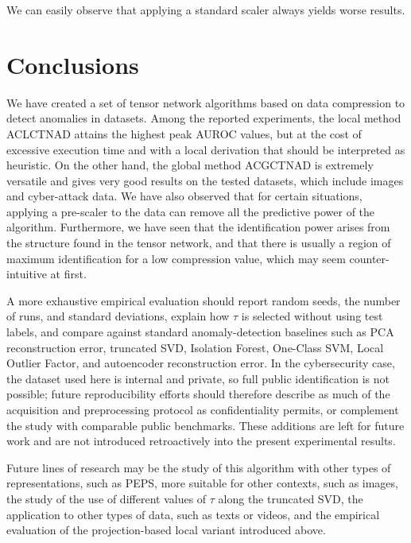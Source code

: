 \documentclass{article}
\begin{document}
We can easily observe that applying a standard scaler always yields worse results.



\section{Conclusions}
We have created a set of tensor network algorithms based on data compression to detect anomalies in datasets. Among the reported experiments, the local method ACLCTNAD attains the highest peak AUROC values, but at the cost of excessive execution time and with a local derivation that should be interpreted as heuristic. On the other hand, the global method ACGCTNAD is extremely versatile and gives very good results on the tested datasets, which include images and cyber-attack data. We have also observed that for certain situations, applying a pre-scaler to the data can remove all the predictive power of the algorithm. Furthermore, we have seen that the identification power arises from the structure found in the tensor network, and that there is usually a region of maximum identification for a low compression value, which may seem counter-intuitive at first.

A more exhaustive empirical evaluation should report random seeds, the number of runs, and standard deviations, explain how $\tau$ is selected without using test labels, and compare against standard anomaly-detection baselines such as PCA reconstruction error, truncated SVD, Isolation Forest, One-Class SVM, Local Outlier Factor, and autoencoder reconstruction error. In the cybersecurity case, the dataset used here is internal and private, so full public identification is not possible; future reproducibility efforts should therefore describe as much of the acquisition and preprocessing protocol as confidentiality permits, or complement the study with comparable public benchmarks. These additions are left for future work and are not introduced retroactively into the present experimental results.

Future lines of research may be the study of this algorithm with other types of representations, such as PEPS, more suitable for other contexts, such as images, the study of the use of different values of $\tau$ along the truncated SVD, the application to other types of data, such as texts or videos, and the empirical evaluation of the projection-based local variant introduced above.



\end{document}
